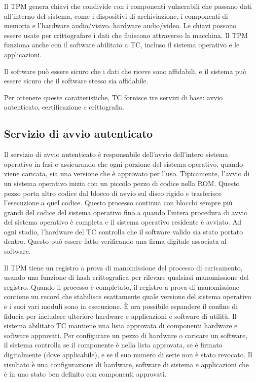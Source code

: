 \singlespacing

Il TPM genera chiavi che condivide con i componenti vulnerabili che passano dati all'interno del sistema, come i dispositivi di archiviazione, i componenti di memoria e l'hardware audio/visivo. hardware audio/video. Le chiavi possono essere usate per crittografare i dati che fluiscono attraverso la macchina. Il TPM funziona anche con il software abilitato a TC, incluso il sistema operativo e le applicazioni.

\singlespacing

Il software può essere sicuro che i dati che riceve sono affidabili, e il sistema può essere sicuro che il software stesso sia affidabile.

\singlespacing

Per ottenere queste caratteristiche, TC fornisce tre servizi di base: avvio autenticato, certificazione e crittografia.

\newpage
\subsection{Servizio di avvio autenticato}
Il servizio di avvio autenticato è responsabile dell'avvio dell'intero sistema operativo in fasi e assicurando che ogni porzione del sistema operativo, quando viene caricata, sia una versione che è approvato per l'uso. Tipicamente, l'avvio di un sistema operativo inizia con un piccolo pezzo di codice nella ROM. Questo pezzo porta altro codice dal blocco di avvio sul disco rigido e trasferisce l'esecuzione a quel codice. Questo processo continua con blocchi sempre più grandi del codice del sistema operativo fino a quando l'intera procedura di avvio del sistema operativo è completa e il sistema operativo residente è avviato. Ad ogni stadio, l'hardware del TC controlla che il software valido sia stato portato dentro. Questo può essere fatto verificando una firma digitale associata al software.

\singlespacing

Il TPM tiene un registro a prova di manomissione del processo di caricamento, usando una funzione di hash crittografica per rilevare qualsiasi manomissione del registro. Quando il processo è completato, il registro a prova di manomissione contiene un record che stabilisce esattamente quale versione del sistema operativo e i suoi vari moduli sono in esecuzione. È ora possibile espandere il confine di fiducia per includere ulteriore hardware e applicazioni e software di utilità. Il sistema abilitato TC mantiene una lista approvata di componenti hardware e software approvati. Per configurare un pezzo di hardware o caricare un software, il sistema controlla se il componente è nella lista approvata, se è firmato digitalmente (dove applicabile), e se il suo numero di serie non è stato revocato. Il risultato è una configurazione di hardware, software di sistema e applicazioni che è in uno stato ben definito con componenti approvati.
